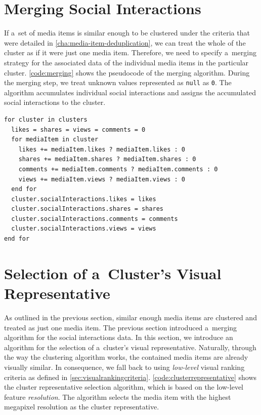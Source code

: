 \section{Merging Social Interactions}
\label{sec:merging-social-interactions}

If a~set of media items is similar enough to be clustered
under the criteria that were detailed in
\autoref{cha:media-item-deduplication},
we can treat the whole of the cluster
as if it were just one media item.
Therefore, we need to specify a~merging strategy
for the associated data of the individual media items
in the particular cluster.
\autoref{code:merging} shows the pseudocode of the merging algorithm.
During the merging step,
we treat unknown values represented as \texttt{null} as \texttt{0}.
The algorithm accumulates individual social interactions
and assigns the accumulated social interactions to the cluster.

\begin{lstlisting}[caption=Pseudocode of the social interactions merging algorithm,
  label=code:merging, float]
for cluster in clusters
  likes = shares = views = comments = 0
  for mediaItem in cluster
    likes += mediaItem.likes ? mediaItem.likes : 0
    shares += mediaItem.shares ? mediaItem.shares : 0
    comments += mediaItem.comments ? mediaItem.comments : 0
    views += mediaItem.views ? mediaItem.views : 0
  end for
  cluster.socialInteractions.likes = likes
  cluster.socialInteractions.shares = shares
  cluster.socialInteractions.comments = comments
  cluster.socialInteractions.views = views
end for     
\end{lstlisting}

\section{Selection of a~Cluster's Visual Representative}  

As outlined in the previous section, similar enough media items
are clustered and treated as just one media item.
The previous section introduced
a~merging algorithm for the social interactions data.
In this section, we introduce an algorithm for the selection of
a~cluster's visual representative.
Naturally, through the way the clustering algorithm works,
the contained media items are already visually similar. 
In consequence, we fall back to using \emph{low-level}
visual ranking criteria as defined in \autoref{sec:visualrankingcriteria}.
\autoref{code:clusterrepresentative} shows the cluster representative
selection algorithm, which is based on the low-level feature \emph{resolution}.
The algorithm selects the media item with the highest megapixel resolution
as the cluster representative.

